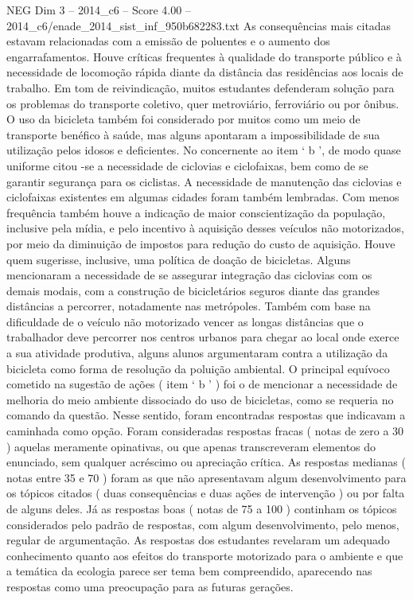 \begin{textsample}{NEG Dim 3 – 2014\_c6 – Score 4.00 – 2014\_c6/enade\_2014\_sist\_inf\_950b682283.txt}
As consequências mais citadas estavam relacionadas com a emissão de poluentes e o aumento dos engarrafamentos.
Houve críticas frequentes à qualidade do transporte público e à necessidade de locomoção rápida diante da distância das residências aos locais de trabalho.
Em tom de reivindicação, muitos estudantes defenderam solução para os problemas do transporte coletivo, quer metroviário, ferroviário ou por ônibus.
O uso da bicicleta também foi considerado por muitos como um meio de transporte benéfico à saúde, mas alguns apontaram a impossibilidade de sua utilização pelos idosos e deficientes.
No concernente ao item ‘ b ’, de modo quase uniforme citou -se a necessidade de ciclovias e ciclofaixas, bem como de se garantir segurança para os ciclistas.
A necessidade de manutenção das ciclovias e ciclofaixas existentes em algumas cidades foram também lembradas.
Com menos frequência também houve a indicação de maior conscientização da população, inclusive pela mídia, e pelo incentivo à aquisição desses veículos não motorizados, por meio da diminuição de impostos para redução do custo de aquisição.
Houve quem sugerisse, inclusive, uma política de doação de bicicletas.
Alguns mencionaram a necessidade de se assegurar integração das ciclovias com os demais modais, com a construção de bicicletários seguros diante das grandes distâncias a percorrer, notadamente nas metrópoles.
Também com base na dificuldade de o veículo não motorizado vencer as longas distâncias que o trabalhador deve percorrer nos centros urbanos para chegar ao local onde exerce a sua atividade produtiva, alguns alunos argumentaram contra a utilização da bicicleta como forma de resolução da poluição ambiental.
O principal equívoco cometido na sugestão de ações ( item ‘ b ’ ) foi o de mencionar a necessidade de melhoria do meio ambiente dissociado do uso de bicicletas, como se requeria no comando da questão.
Nesse sentido, foram encontradas respostas que indicavam a caminhada como opção.
Foram consideradas respostas fracas ( notas de zero a 30 ) aquelas meramente opinativas, ou que apenas transcreveram elementos do enunciado, sem qualquer acréscimo ou apreciação crítica.
As respostas medianas ( notas entre 35 e 70 ) foram as que não apresentavam algum desenvolvimento para os tópicos citados ( duas consequências e duas ações de intervenção ) ou por falta de alguns deles.
Já as respostas boas ( notas de 75 a 100 ) continham os tópicos considerados pelo padrão de respostas, com algum desenvolvimento, pelo menos, regular de argumentação.
As respostas dos estudantes revelaram um adequado conhecimento quanto aos efeitos do transporte motorizado para o ambiente e que a temática da ecologia parece ser tema bem compreendido, aparecendo nas respostas como uma preocupação para as futuras gerações.

\end{textsample}
